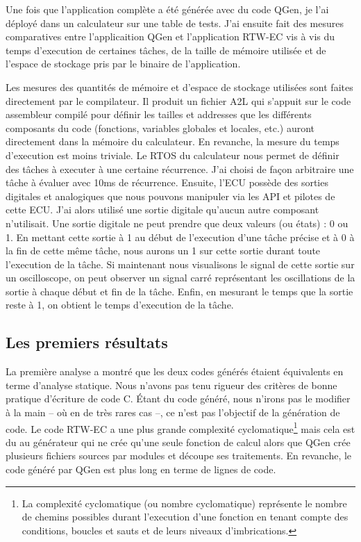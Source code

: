 Une fois que l'application complète a été générée avec du code QGen, je l'ai
déployé dans un calculateur sur une table de tests. J'ai ensuite fait des
mesures comparatives entre l'applicaition QGen et l'application
RTW-EC\up{\circledR} vis à vis du temps d'execution de certaines tâches, de la
taille de mémoire utilisée et de l'espace de stockage pris par le binaire de
l'application.

Les mesures des quantités de mémoire et d'espace de stockage utilisées sont faites
directement par le compilateur. Il produit un fichier A2L qui s'appuit sur le
code assembleur compilé pour définir les tailles et addresses que les différents
composants du code (fonctions, variables globales et locales, etc.) auront directement
dans la mémoire du calculateur.
En revanche, la mesure du temps d'execution est moins triviale. Le RTOS du
calculateur nous permet de définir des tâches à executer à une certaine
récurrence. J'ai choisi de façon arbitraire une tâche à évaluer avec 10ms de récurrence.
Ensuite, l'ECU possède des sorties digitales et analogiques que nous pouvons manipuler via les API et
pilotes de cette ECU. J'ai alors utilisé une sortie digitale qu'aucun autre
composant n'utilisait. Une sortie digitale ne peut prendre que deux valeurs (ou
états) : 0 ou 1. En mettant cette sortie à 1 au début de l'execution d'une tâche
précise et à 0 à la fin de cette même tâche, nous aurons un 1 sur cette
sortie durant toute l'execution de la tâche. Si maintenant nous visualisons le
signal de cette sortie sur un oscilloscope, on peut observer un signal carré
représentant les oscillations de la sortie à chaque début et fin de la tâche.
Enfin, en mesurant le temps que la sortie reste à 1, on obtient le temps
d'execution de la tâche.

\subsection{Les premiers résultats}
La première analyse a montré que les deux codes générés étaient équivalents en
terme d'analyse statique. Nous n'avons pas tenu rigueur des critères de bonne
pratique d'écriture de code C. \'Etant du code généré, nous n'irons pas le
modifier à la main -- où en de très rares cas --, ce n'est pas l'objectif de la
génération de code. Le code RTW-EC\up{\circledR} a une plus grande complexité
cyclomatique\footnote{La complexité cyclomatique (ou nombre cyclomatique)
représente le nombre de \og chemins \fg{} possibles durant l'execution d'une
fonction en tenant compte des conditions, boucles et sauts et de leurs niveaux
d'imbrications.} mais cela est du au générateur qui ne crée qu'une seule
fonction de calcul alors que QGen crée plusieurs fichiers sources par modules
et découpe ses traitements. En revanche, le code généré par QGen est plus
long en terme de lignes de code.

